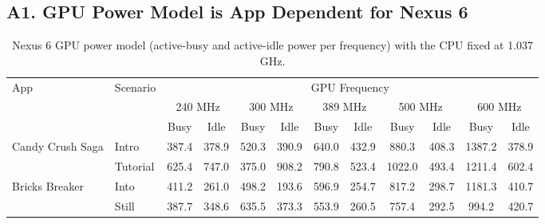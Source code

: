 \subsection*{A1. GPU Power Model is App Dependent for Nexus 6}
\begin{table*}[tp]
{\footnotesize
    \centering
    \caption{Nexus 6 GPU power model (active-busy and active-idle power per frequency) with the CPU fixed at 1.037 GHz.}
    \vspace{-0.1in}
    \begin{tabular}{|p{15mm}|p{9mm}|c|c|c|c|c|c|c|c|c|c|}
    \hline
    App & Scenario & \multicolumn{10}{c|}{GPU Frequency} \\
    \cline{3-12}
     &  & \multicolumn{2}{c|}{240 MHz} & \multicolumn{2}{c|}{300 MHz} & \multicolumn{2}{c|}{389 MHz} & \multicolumn{2}{c|}{500 MHz} & \multicolumn{2}{c|}{600 MHz} \\
     \cline{3-12}
     & & Busy & Idle & Busy & Idle & Busy & Idle & Busy & Idle & Busy & Idle \\
    \hline
      \multirow{2}{15mm}{Candy Crush Saga}  & Intro & 387.4 & 378.9 & 520.3 & 390.9 & 640.0 & 432.9 & 880.3 & 408.3 & 1387.2 & 378.9 \\
      \cline{2-12}
         & Tutorial & 625.4 & 747.0 & 375.0 & 908.2 & 790.8 & 523.4 & 1022.0 & 493.4 & 1211.4 & 602.4 \\
         \hline
        \multirow{2}{13mm}{Bricks Breaker}  & Into & 411.2 & 261.0 & 498.2 & 193.6 & 596.9 & 254.7 & 817.2 & 298.7 & 1181.3 & 410.7 \\
        \cline{2-12}
         & Still & 387.7 & 348.6 & 635.5 & 373.3 & 553.9 & 260.5 & 757.4 & 292.5 & 994.2 & 420.7 \\
         \hline
    \end{tabular}
    \label{tab:gpumodel_nexus6}
    \vspace{-0.1in}
    }
\end{table*}

